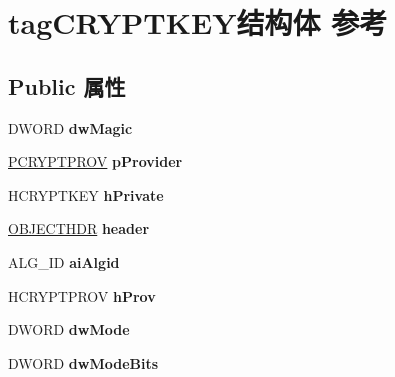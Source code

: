 \hypertarget{structtag_c_r_y_p_t_k_e_y}{}\section{tag\+C\+R\+Y\+P\+T\+K\+E\+Y结构体 参考}
\label{structtag_c_r_y_p_t_k_e_y}
\subsection*{Public 属性}
\begin{DoxyCompactItemize}
\item 
\mbox{\label{structtag_c_r_y_p_t_k_e_y_a768bf4fba4d099746964402ae79d4e2b}} 
D\+W\+O\+RD {\bfseries dw\+Magic}
\item 
\mbox{\label{structtag_c_r_y_p_t_k_e_y_ac3ef895b778c8e18b2d70df5fa0f551a}} 
\hyperlink{structtag_c_r_y_p_t_p_r_o_v}{P\+C\+R\+Y\+P\+T\+P\+R\+OV} {\bfseries p\+Provider}
\item 
\mbox{\label{structtag_c_r_y_p_t_k_e_y_a29cc6179c1a5fe16847304518ed8b595}} 
H\+C\+R\+Y\+P\+T\+K\+EY {\bfseries h\+Private}
\item 
\mbox{\label{structtag_c_r_y_p_t_k_e_y_a516eeeced201ffd7615142fe27b1821a}} 
\hyperlink{structtag_o_b_j_e_c_t_h_d_r}{O\+B\+J\+E\+C\+T\+H\+DR} {\bfseries header}
\item 
\mbox{\label{structtag_c_r_y_p_t_k_e_y_a689d0302267fa60dcac88527db6924b4}} 
A\+L\+G\+\_\+\+ID {\bfseries ai\+Algid}
\item 
\mbox{\label{structtag_c_r_y_p_t_k_e_y_afb22ab6979a8265750db4e7ce06fce2e}} 
H\+C\+R\+Y\+P\+T\+P\+R\+OV {\bfseries h\+Prov}
\item 
\mbox{\label{structtag_c_r_y_p_t_k_e_y_a29156af6fa75136988958e01f08eb495}} 
D\+W\+O\+RD {\bfseries dw\+Mode}
\item 
\mbox{\label{structtag_c_r_y_p_t_k_e_y_ad8ab2f2cd8ffd33f20a417e602d1481d}} 
D\+W\+O\+RD {\bfseries dw\+Mode\+Bits}
\item 

\end{DoxyCompactItemize}
